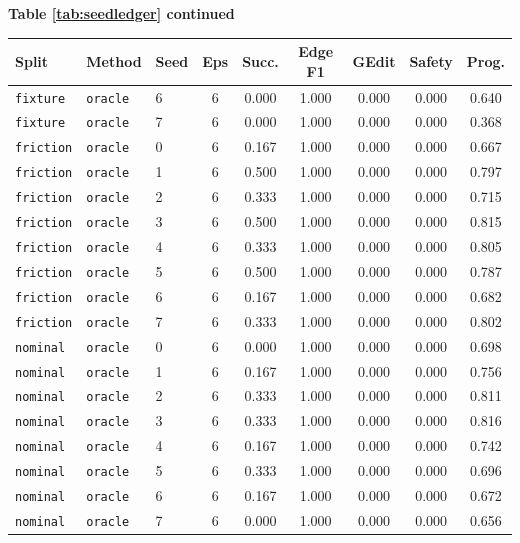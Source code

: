 \documentclass{article}
\begin{document}
\begin{center}
\textbf{Table \ref{tab:seedledger} continued}\\[0.4ex]
\begin{tabular}{lllcccccc}
\toprule
Split & Method & Seed & Eps & Succ. & Edge F1 & GEdit & Safety & Prog. \\
\midrule
\texttt{fixture} & \texttt{oracle} & 6 & 6 & 0.000 & 1.000 & 0.000 & 0.000 & 0.640 \\
\texttt{fixture} & \texttt{oracle} & 7 & 6 & 0.000 & 1.000 & 0.000 & 0.000 & 0.368 \\
\texttt{friction} & \texttt{oracle} & 0 & 6 & 0.167 & 1.000 & 0.000 & 0.000 & 0.667 \\
\texttt{friction} & \texttt{oracle} & 1 & 6 & 0.500 & 1.000 & 0.000 & 0.000 & 0.797 \\
\texttt{friction} & \texttt{oracle} & 2 & 6 & 0.333 & 1.000 & 0.000 & 0.000 & 0.715 \\
\texttt{friction} & \texttt{oracle} & 3 & 6 & 0.500 & 1.000 & 0.000 & 0.000 & 0.815 \\
\texttt{friction} & \texttt{oracle} & 4 & 6 & 0.333 & 1.000 & 0.000 & 0.000 & 0.805 \\
\texttt{friction} & \texttt{oracle} & 5 & 6 & 0.500 & 1.000 & 0.000 & 0.000 & 0.787 \\
\texttt{friction} & \texttt{oracle} & 6 & 6 & 0.167 & 1.000 & 0.000 & 0.000 & 0.682 \\
\texttt{friction} & \texttt{oracle} & 7 & 6 & 0.333 & 1.000 & 0.000 & 0.000 & 0.802 \\
\texttt{nominal} & \texttt{oracle} & 0 & 6 & 0.000 & 1.000 & 0.000 & 0.000 & 0.698 \\
\texttt{nominal} & \texttt{oracle} & 1 & 6 & 0.167 & 1.000 & 0.000 & 0.000 & 0.756 \\
\texttt{nominal} & \texttt{oracle} & 2 & 6 & 0.333 & 1.000 & 0.000 & 0.000 & 0.811 \\
\texttt{nominal} & \texttt{oracle} & 3 & 6 & 0.333 & 1.000 & 0.000 & 0.000 & 0.816 \\
\texttt{nominal} & \texttt{oracle} & 4 & 6 & 0.167 & 1.000 & 0.000 & 0.000 & 0.742 \\
\texttt{nominal} & \texttt{oracle} & 5 & 6 & 0.333 & 1.000 & 0.000 & 0.000 & 0.696 \\
\texttt{nominal} & \texttt{oracle} & 6 & 6 & 0.167 & 1.000 & 0.000 & 0.000 & 0.672 \\
\texttt{nominal} & \texttt{oracle} & 7 & 6 & 0.000 & 1.000 & 0.000 & 0.000 & 0.656 \\

\end{tabular}
\end{center}
\end{document}

